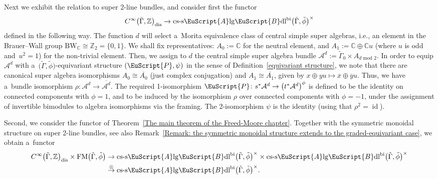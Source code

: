 \documentclass[10pt,a4paper]{amsart}
\numberwithin{equation}{section}
\def\mathscr#1{\EuScript{#1}}
\def\Z {\mathbb{Z}}
\def\C {\mathbb{C}}
\def\subset{\subseteq}
\newcommand{\id}{\operatorname{id}}
\newcommand{\LineBdl}{\mathscr{L}\mathscr{B}\mathrm{dl}}
\newcommand{\stwoLineBdltriv}{\mathrm{s}2\LineBdl_{\mathrm{triv}}}
\newcommand{\Alg}{\Incl\mathrm{lg}}
\newcommand{\cssAlg}{\mathrm{cs\text{-}s}\Alg}
\newcommand{\cssAlgBdlbi}{\cssAlg\mathscr{B}\mathrm{dl}^{\mathrm{bi}}}
\newcommand{\Incl}{\mathscr{A}}
\begin{document}
Next we exhibit the relation to super 2-line bundles, and consider first the functor
\begin{equation*}
C^{\infty}\bigl(\tilde \Gamma,\Z\bigr)_{\rm dis} \to\cssAlgBdlbi\bigl(\tilde\Gamma,\tilde\phi\bigr)^{\times}
\end{equation*}
defined in the following way. The function $d$ will select a~Morita equivalence class of central simple super algebras, i.e., an element in the Brauer--Wall group $\mathrm{BW}_{\C}\cong \Z_2=\{0,1\}$. We shall fix representatives: $A_0:=\C$ for the neutral element, and $A_{1}:=\C \oplus \C u$ (where $u$ is odd and~${u^2=1}$) for the non-trivial element. Then, we assign to $d$ the central simple super algebra bundle $\mathcal{A}^{d} := \tilde\Gamma_0 \times A_{d \text{ mod } 2}$.
In order to equip $\mathcal{A}^{d}$ with a~$\bigl(\tilde\Gamma,\tilde\phi\bigr)$-equivariant structure $(\mathscr{P},\psi)$ in the sense of Definition~\ref{equivariant structure}, we note that there are canonical super algebra isomorphisms $A_0 \cong \overline{A_0}$ (just complex conjugation) and $A_1 \cong \overline{A_1}$, given by $x\oplus yu \mapsto \overline{x}\oplus\overline{y}u$. Thus, we have a~bundle isomorphism $\rho\colon \mathcal{A}^{d} \to \overline{\mathcal{A}^{d}}$. The required 1-isomorphism $\mathscr{P}\colon s^*\mathcal{A}^{d} \to \bigl(t^*\mathcal{A}^{d}\bigr)^{\phi}$ is defined to be the identity on connected components with $\phi=1$, and to be induced by the isomorphism $\rho$ over connected components with $\phi=-1$, under the assignment of invertible bimodules to algebra isomorphisms via the framing. The 2-isomorphism $\psi$ is the identity (using that $\rho^2=\id$).

Second, we consider the functor
\smash{$
\mathrm{FM}\bigl(\tilde\Gamma,\tilde\phi\bigr) \to \stwoLineBdltriv^{\text{ref}}\bigl(\tilde\Gamma,\tilde\phi\bigr)
\subset\cssAlgBdlbi\bigl(\tilde\Gamma,\tilde\phi\bigr)^{\times}
$}
of
Theorem~\ref{The main theorem of the Freed-Moore chapter}. Together with the symmetric monoidal structure on super 2-line bundles, see also Remark~\ref{Remark: the symmetric monoidal structure extends to the graded-equivariant case}, we obtain a~functor
\begin{align}
 C^{\infty}\bigl(\tilde \Gamma,\Z\bigr)_{\rm dis} \times \mathrm{FM}\bigl(\tilde\Gamma,\tilde\phi\bigr) &\to \cssAlgBdlbi\bigl(\tilde\Gamma,\tilde\phi\bigr)^{\times}\times \cssAlgBdlbi\bigl(\tilde\Gamma,\tilde\phi\bigr)^{\times}\nonumber \\
 &\stackrel\otimes\to \cssAlgBdlbi\bigl(\tilde\Gamma,\tilde\phi\bigr)^{\times} .\label{DFM-twistings-to-algebra-bundles}
\end{align}
\end{document}
